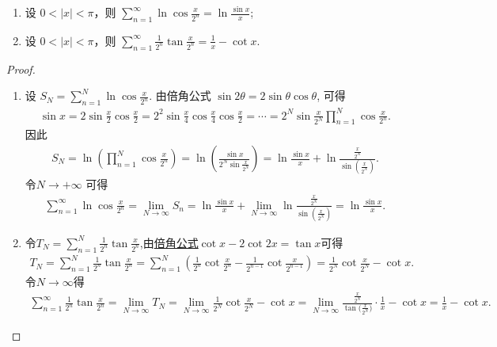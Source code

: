 \documentclass[../../main.tex]{subfiles}%
\begin{document}
\begin{example}
\begin{enumerate}[(1)]
\item 设 \(0 < |x| < \pi\)，则
\(\sum\limits_{n=1}^{\infty}{\ln\cos \frac{x}{2^n}}=\ln \frac{\sin x}{x}\);

\item 设 \(0 < |x| < \pi\)，则
\(\sum\limits_{n=1}^{\infty}{\frac{1}{2^n}\tan \frac{x}{2^n}}=\frac{1}{x}-\cot x\).
\end{enumerate}
\end{example}
\begin{proof}
\begin{enumerate}[(1)]
\item 设 \(S_N = \sum\limits_{n=1}^N \ln \cos \frac{x}{2^n}\). 由倍角公式 \(\sin 2\theta = 2 \sin \theta \cos \theta\), 可得
\begin{align*}
\sin x = 2 \sin\frac{x}{2} \cos\frac{x}{2} = 2^2 \sin\frac{x}{4} \cos\frac{x}{4} \cos\frac{x}{2} = \cdots = 2^N \sin\frac{x}{2^N} \prod_{n=1}^N \cos\frac{x}{2^n}.
\end{align*}
因此
\begin{align*}
S_N = \ln \left( \prod_{n=1}^N \cos\frac{x}{2^n} \right) 
= \ln \left( \frac{\sin x}{2^N \sin\frac{x}{2^N}} \right) 
= \ln \frac{\sin x}{x} + \ln \frac{\frac{x}{2^N}}{\sin \left( \frac{x}{2^N} \right)}.
\end{align*}
令\(N\to +\infty\) 可得
\begin{align*}
\sum_{n=1}^{\infty}{\ln\cos \frac{x}{2^n}}=\underset{N\rightarrow \infty}{\lim}S_n=\ln \frac{\sin x}{x}+\underset{N\rightarrow \infty}{\lim}\ln \frac{\frac{x}{2^N}}{\sin \left( \frac{x}{2^N} \right)}=\ln \frac{\sin x}{x}.
\end{align*}

\item 令$T_N = \sum_{n=1}^N \frac{1}{2^n} \tan \frac{x}{2^n}$,由\hyperref[theorem:三角函数倍角公式]{倍角公式}\(\cot x - 2\cot 2x = \tan x\)可得
\begin{align*}
T_N = \sum_{n=1}^N \frac{1}{2^n} \tan \frac{x}{2^n} = \sum_{n=1}^N \left( \frac{1}{2^n} \cot\frac{x}{2^n} - \frac{1}{2^{n-1}} \cot\frac{x}{2^{n-1}} \right) = \frac{1}{2^N} \cot\frac{x}{2^N} - \cot x.
\end{align*}
令\(N\to\infty\)得
\begin{align*}
\sum_{n=1}^{\infty}{\frac{1}{2^n}\tan \frac{x}{2^n}}=\lim_{N\rightarrow \infty} T_N=\lim_{N\rightarrow \infty} \frac{1}{2^N}\cot \frac{x}{2^N}-\cot x=\lim_{N\rightarrow \infty} \frac{\frac{x}{2^N}}{\tan\mathrm{(}\frac{x}{2^N})}\cdot \frac{1}{x}-\cot x=\frac{1}{x}-\cot x.
\end{align*}
\end{enumerate}
\end{proof}
\end{document}
